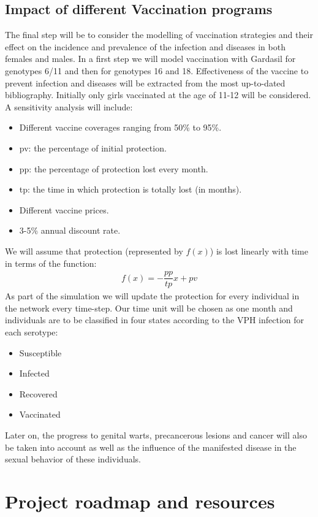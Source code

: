 \subsection{Impact of different Vaccination programs}

The final step will be to consider the modelling of vaccination strategies and their effect on the incidence and prevalence of the infection and diseases in both females and males. In a first step we will model vaccination with Gardasil for genotypes 6/11 and then for genotypes 16 and 18. Effectiveness of the vaccine to prevent infection and diseases will be extracted from the most up-to-dated bibliography. Initially only girls vaccinated at the age of 11-12 will be considered. A sensitivity analysis will include:
\begin{itemize}
	\item Different vaccine coverages ranging from 50\% to 95\%.
	\item pv: the percentage of initial protection.
	\item pp: the percentage of protection lost every month.
	\item tp: the time in which protection is totally lost (in months).
	\item Different vaccine prices.
	\item 3-5\% annual discount rate.
\end{itemize}

We will assume that protection (represented by $f(x)$) is lost linearly with time in terms of the function: 
\begin{align*}
f(x)=-\dfrac{pp}{tp}x+pv
\end{align*}
As part of the simulation we will update the protection for every individual in the network every time-step. Our time unit will be chosen as one month and individuals are to be classified in four states according to the VPH infection for each serotype:
\begin{itemize}
	\item Susceptible
	\item Infected
	\item Recovered
	\item Vaccinated
\end{itemize}

Later on, the progress to genital warts, precancerous lesions and cancer will also be taken into account as well as the influence of the manifested disease in the sexual behavior of these individuals. 

\section{Project roadmap and resources}

